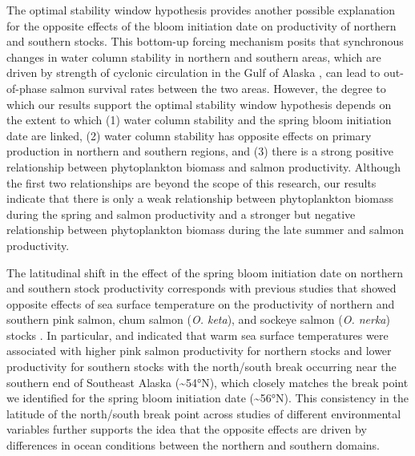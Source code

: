 The optimal stability window hypothesis \citep{Cury1989a, Gargett1997a} provides
another possible explanation for the opposite effects of the bloom initiation
date on productivity of northern and southern stocks.  This bottom-up forcing
mechanism posits that synchronous changes in water column stability in northern
and southern areas, which are driven by strength of cyclonic circulation in the
Gulf of Alaska \citep{Gargett1997a}, can lead to out-of-phase salmon survival
rates between the two areas. However, the degree to which our results support
the optimal stability window hypothesis depends on the extent to which (1) water
column stability and the spring bloom initiation date are linked, (2) water
column stability has opposite effects on primary production in northern and
southern regions, and (3) there is a strong positive relationship between
phytoplankton biomass and salmon productivity. Although the first two
relationships are beyond the scope of this research, our results indicate that
there is only a weak relationship between phytoplankton biomass during the
spring and salmon productivity and a stronger but negative relationship between
phytoplankton biomass during the late summer and salmon productivity.

The latitudinal shift in the effect of the spring bloom initiation date on
northern and southern stock productivity corresponds with previous studies that
showed opposite effects of sea surface temperature on the productivity of
northern and southern pink salmon, chum salmon (\emph{O.  keta}), and sockeye
salmon (\emph{O. nerka}) stocks \citep{Mueter2002a, Su2004a}. In particular,
\citet{Mueter2002a} and \citet{Su2004a} indicated that warm sea surface
temperatures were associated with higher pink salmon productivity for northern
stocks and lower productivity for southern stocks with the north/south break
occurring near the southern end of Southeast Alaska (\textasciitilde{}54°N),
which closely matches the break point we identified for the spring bloom
initiation date (\textasciitilde{}56°N).  This consistency in the latitude of
the north/south break point across studies of different environmental variables
further supports the idea that the opposite effects are driven by differences in
ocean conditions between the northern and southern domains.

